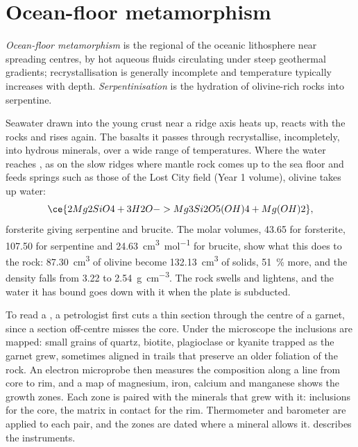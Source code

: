 \section{Ocean-floor metamorphism}\label{sec:b2:pt-paths:ocean-floor}

\begin{definition}\label{def:b2:pt-paths:ocean-floor}
\emph{Ocean-floor metamorphism} is the regional
 of the oceanic lithosphere near spreading centres, by hot aqueous fluids
circulating under steep geothermal gradients; recrystallisation is generally incomplete
and temperature typically increases with depth. \emph{Serpentinisation}
is the hydration of olivine-rich rocks into serpentine.
\end{definition}

Seawater drawn into the young crust near a ridge axis heats up, reacts with the rocks and
rises again. The basalts it passes through recrystallise, incompletely, into hydrous
minerals, over a wide range of temperatures. Where the water reaches , as on
the slow ridges where mantle rock comes up to the sea floor and feeds springs such as
those of the Lost City field (Year 1 volume), olivine takes up water:
\[
\ce{2 Mg2SiO4 + 3 H2O -> Mg3Si2O5(OH)4 + Mg(OH)2},
\]
forsterite giving serpentine and brucite. The molar volumes, 43.65 for forsterite, 107.50
for serpentine and \qty{24.63}{cm^3.mol^{-1}} for brucite, show what this does to the rock:
\qty{87.30}{cm^3} of olivine become \qty{132.13}{cm^3} of solids, \qty{51}{\percent}
more, and the density falls from 3.22 to \qty{2.54}{g.cm^{-3}}. The rock swells and
lightens, and the water it has bound goes down with it when the plate is subducted.

\begin{inthelab}
To read a , a petrologist first cuts a thin section through the centre of a
garnet, since a section off-centre misses the core. Under the microscope the inclusions
are mapped: small grains of quartz, biotite, plagioclase or kyanite trapped as the garnet
grew, sometimes aligned in trails that preserve an older foliation of the rock. An electron
microprobe then measures the composition along a line from core to rim, and a map of
magnesium, iron, calcium and manganese shows the growth zones. Each zone is paired with
the minerals that grew with it: inclusions for the core, the matrix in contact for the
rim. Thermometer and barometer are applied to each pair, and the zones are dated where a
mineral allows it.  describes the instruments.
\end{inthelab}

